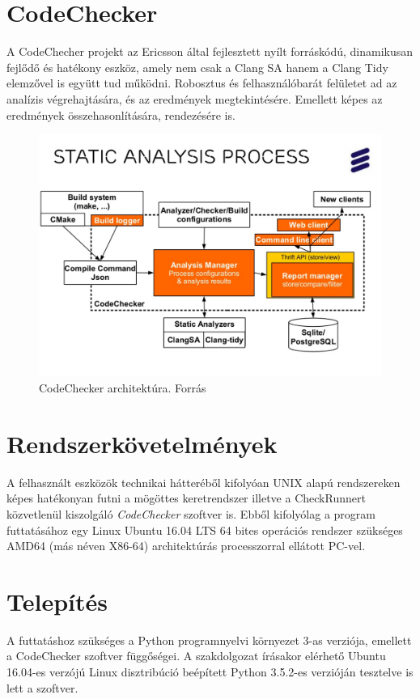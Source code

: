 \documentclass[a4paper,12pt]{report}
\begin{document}
\section{CodeChecker}
A CodeChecher projekt az Ericsson által fejlesztett nyílt forráskódú, dinamikusan fejlődő és hatékony eszköz, amely nem csak a Clang SA hanem a Clang Tidy elemzővel is együtt tud működni. Robosztus és felhasználóbarát felületet ad az analízis végrehajtására, és az eredmények megtekintésére. Emellett képes az eredmények összehasonlítására, rendezésére is.

\begin{figure}[h]
\caption{CodeChecker architektúra. Forrás \cite{codecheckerslide}}
\centering
\includegraphics[scale=0.2]{codechecker.png}
\end{figure}

\section{Rendszerkövetelmények}
A felhasznált eszközök technikai hátteréből kifolyóan UNIX alapú rendszereken képes hatékonyan futni a mögöttes keretrendszer illetve a CheckRunnert közvetlenül kiszolgáló \emph{CodeChecker} szoftver is. Ebből kifolyólag a program futtatásához egy Linux Ubuntu 16.04 LTS 64 bites operációs rendszer szükséges AMD64 (más néven X86-64) architektúrás processzorral ellátott PC-vel.

\section{Telepítés}
A futtatáshoz szükséges a Python programnyelvi környezet 3-as verziója, emellett a CodeChecker szoftver függőségei. A szakdolgozat írásakor elérhető Ubuntu 16.04-es verzójú Linux disztribúció beépített Python 3.5.2-es verzióján tesztelve is lett a szoftver.
\end{document}
